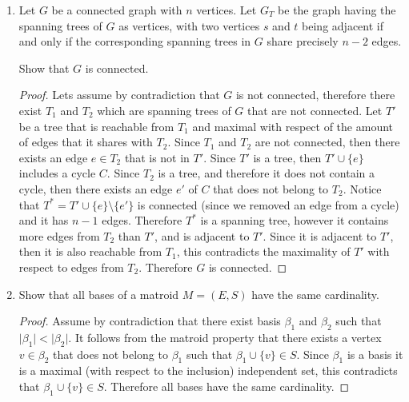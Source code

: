 \documentclass[12pt]{article}
\begin{document}
\begin{enumerate}
\begin{proof}
    \end{proof} 

    Notice that this matrix is an upper triangular matrix, therefore its determinant is given by $n^{n-1}$.
    
    Therefore, by applying the matrix tree theorem, we get that there exist $n^{n-2}$ different spanning trees for the complete graph $K_n$
    
    \item Let $G$ be a connected graph with $n$ vertices. Let $G_T$ be the graph having the spanning trees of $G$ as vertices, with two vertices $s$ and $t$ being adjacent if and only if the corresponding spanning trees in $G$ share precisely $n-2$ edges.
    
    Show that $G$ is connected.
    
    \begin{proof}
    Lets assume by contradiction that $G$ is not connected, therefore there exist $T_1$ and $T_2$ which are spanning trees of $G$ that are not connected. Let $T'$ be a tree that is reachable from $T_1$ and maximal with respect of the amount of edges that it shares with $T_2$. Since $T_1$ and $T_2$ are not connected, then there exists an edge $e \in T_2$ that is not in $T'$. Since $T'$ is a tree, then $T' \cup \{e\}$ includes a cycle $C$. Since $T_2$ is a tree, and therefore it does not contain a cycle, then there exists an edge $e'$ of $C$ that does not belong to $T_2$. Notice that $T^* = T' \cup \{e\} \setminus \{e'\}$ is connected (since we removed an edge from a cycle) and it has $n-1$ edges. Therefore $T^*$ is a spanning tree, however it contains more edges from $T_2$ than $T'$, and is adjacent to $T'$. Since it is adjacent to $T'$, then it is also reachable from $T_1$, this contradicts the maximality of $T'$ with respect to edges from $T_2$. Therefore $G$ is connected.
    \end{proof}
    
    \item Show that all bases of a matroid $M=(E,S)$ have the same cardinality.
    \begin{proof}
    Assume by contradiction that there exist basis $\beta_1$ and $\beta_2$ such that $\vert \beta_1 \vert < \vert \beta_2 \vert$. It follows from the matroid property that there exists a vertex $v \in \beta_2$ that does not belong to $\beta_1$ such that $\beta_1 \cup \{ v \} \in S$. Since $\beta_1$ is a basis it is a maximal (with respect to the inclusion) independent set, this contradicts that $\beta_1 \cup \{ v \} \in S$. Therefore all bases have the same cardinality.
    

\end{proof}
\end{enumerate}
\end{document}
